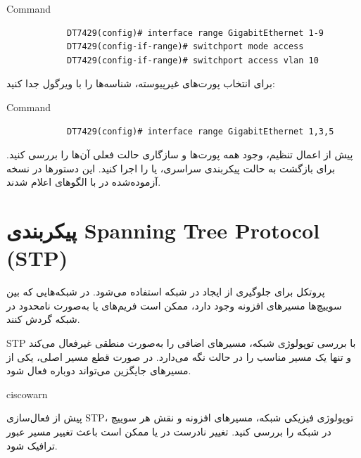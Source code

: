 \documentclass[11pt,letterpaper]{report}
\newenvironment{tipbox}[1]{%
	\begin{noticebox}[title={\textbf{\faLightbulb\ #1}}]{ciscowarn}
	}{%
	\end{noticebox}
}
\begin{document}
	\begin{LTR}
		\begin{cliexample}{Command}
			\begin{verbatim}
			DT7429(config)# interface range GigabitEthernet 1-9
			DT7429(config-if-range)# switchport mode access
			DT7429(config-if-range)# switchport access vlan 10
			\end{verbatim}
		\end{cliexample}
	\end{LTR}

	برای انتخاب پورت‌های غیرپیوسته، شناسه‌ها را با ویرگول جدا کنید:

	\begin{LTR}
		\begin{cliexample}{Command}
			\begin{verbatim}
			DT7429(config)# interface range GigabitEthernet 1,3,5
			\end{verbatim}
		\end{cliexample}
	\end{LTR}

	پیش از اعمال تنظیم، وجود همه پورت‌ها و سازگاری حالت فعلی آن‌ها را
	بررسی کنید. برای بازگشت به حالت پیکربندی سراسری،  یا
	 را اجرا کنید. این دستورها در نسخه آزموده‌شده در
	 با الگوهای  اعلام شدند.

	\chapter{پیکربندی Spanning Tree Protocol (STP)}

	پروتکل  برای جلوگیری از ایجاد
	 در شبکه استفاده می‌شود. در شبکه‌هایی که بین
	سوییچ‌ها مسیرهای افزونه وجود دارد، ممکن است فریم‌های 
	یا  به‌صورت نامحدود در شبکه گردش کنند.

	STP با بررسی توپولوژی شبکه، مسیرهای اضافی را به‌صورت منطقی
	غیرفعال می‌کند و تنها یک مسیر مناسب را در حالت 
	نگه می‌دارد. در صورت قطع مسیر اصلی، یکی از مسیرهای جایگزین
	می‌تواند دوباره فعال شود.

	\begin{tipbox}{نکته مدیریتی}
		پیش از فعال‌سازی STP، توپولوژی فیزیکی شبکه، مسیرهای افزونه و
		نقش هر سوییچ در شبکه را بررسی کنید. تغییر نادرست در
		 یا  ممکن است باعث تغییر
		مسیر عبور ترافیک شود.
	\end{tipbox}


\end{document}
